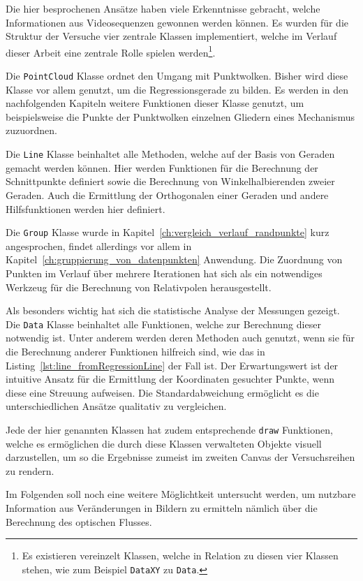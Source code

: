 Die hier besprochenen Ansätze haben viele Erkenntnisse gebracht, welche Informationen aus Videosequenzen gewonnen werden können.
Es wurden für die Struktur der Versuche vier zentrale Klassen implementiert, welche im Verlauf dieser Arbeit eine zentrale Rolle spielen werden\footnote{Es existieren vereinzelt Klassen, welche in Relation zu diesen vier Klassen stehen, wie zum Beispiel \lstinline{DataXY} zu \lstinline{Data}.}.

Die \lstinline{PointCloud} Klasse ordnet den Umgang mit Punktwolken.
Bisher wird diese Klasse vor allem genutzt, um die Regressionsgerade zu bilden. Es werden in den nachfolgenden Kapiteln weitere Funktionen dieser Klasse genutzt, um beispielsweise die Punkte der Punktwolken einzelnen Gliedern eines Mechanismus zuzuordnen.

Die \lstinline{Line} Klasse beinhaltet alle Methoden, welche auf der Basis von Geraden gemacht werden können.
Hier werden Funktionen für die Berechnung der Schnittpunkte definiert sowie die Berechnung von Winkelhalbierenden zweier Geraden.
Auch die Ermittlung der Orthogonalen einer Geraden und andere Hilfsfunktionen werden hier definiert.

Die \lstinline{Group} Klasse wurde in Kapitel~\ref{ch:vergleich_verlauf_randpunkte} kurz angesprochen, findet allerdings vor allem in Kapitel~\ref{ch:gruppierung_von_datenpunkten} Anwendung.
Die Zuordnung von Punkten im Verlauf über mehrere Iterationen hat sich als ein notwendiges Werkzeug für die Berechnung von Relativpolen herausgestellt.

Als besonders wichtig hat sich die statistische Analyse der Messungen gezeigt.
Die \lstinline{Data} Klasse beinhaltet alle Funktionen, welche zur Berechnung dieser notwendig ist.
Unter anderem werden deren Methoden auch genutzt, wenn sie für die Berechnung anderer Funktionen hilfreich sind, wie das in Listing~\ref{lst:line_fromRegressionLine} der Fall ist.
Der Erwartungswert ist der intuitive Ansatz für die Ermittlung der Koordinaten gesuchter Punkte, wenn diese eine Streuung aufweisen.
Die Standardabweichung ermöglicht es die unterschiedlichen Ansätze qualitativ zu vergleichen.

Jede der hier genannten Klassen hat zudem entsprechende \lstinline{draw} Funktionen, welche es ermöglichen die durch diese Klassen verwalteten Objekte visuell darzustellen, um so die Ergebnisse zumeist im zweiten Canvas der Versuchsreihen zu rendern.

Im Folgenden soll noch eine weitere Möglichtkeit untersucht werden, um nutzbare Information aus Veränderungen in Bildern zu ermitteln nämlich über die Berechnung des optischen Flusses.

